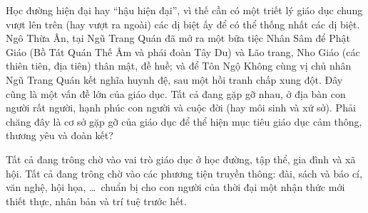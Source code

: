 Học đường hiện đại hay ``hậu hiện đại'', vì thế cần có một triết lý giáo dục chung vượt lên trên (hay vượt ra ngoài) các dị biệt ấy để có thể thống nhất các dị biệt. Ngô Thừa Ân, tại Ngũ Trang Quán đã mở ra một bữa tiệc Nhân Sâm để Phật Giáo (Bồ Tát Quán Thế Âm và phái đoàn Tây Du) và Lão trang, Nho Giáo (các thiên tiên, địa tiên) thân mật, đề huề; và để Tôn Ngộ Không cùng vị chủ nhân Ngũ Trang Quán kết nghĩa huynh đệ, sau một hồi tranh chấp xung đột. Đây cũng là một vấn đề lớn của giáo dục. Tất cả đang gặp gỡ nhau, ở địa bàn con người rất người, hạnh phúc con người và cuộc đời (hay môi sinh và xứ sở). Phải chăng đây là cơ sở gặp gỡ của giáo dục để thể hiện mục tiêu giáo dục cảm thông, thương yêu và đoàn kết?

Tất cả đang trông chờ vào vai trò giáo dục ở học đường, tập thể, gia đình và xã hội. Tất cả đang trông chờ vào các phương tiện truyền thông: đài, sách và báo cí, văn nghệ, hội họa, \ldots ~chuẩn bị cho con người của thời đại một nhận thức mới thiết thực, nhân bản và trí tuệ trước hết.

